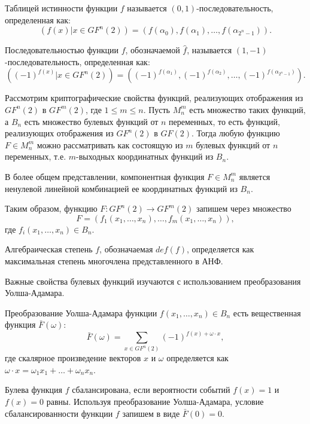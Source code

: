 Таблицей истинности функции $f$ называется $(0,1)$-последовательность,
определенная как:
\begin{equation}(f(x) | x \in GF^n(2)) = (f(\alpha_0), f(\alpha_1), \ldots,
f(\alpha_{2^n - 1})).\end{equation}

Последовательностью функции $f$, обозначаемой $\hat{f}$, называется
$(1,-1)$-последовательность, определенная как:
\begin{equation}((-1)^{f(x)}| x \in GF^n(2)) = ((-1)^{f(\alpha_1)},
(-1)^{f(\alpha_2)}, \ldots, (-1)^{f(\alpha_{2^n - 1})}).\end{equation}

Рассмотрим криптографические свойства функций, реализующих отображения из
$GF^n(2)$ в $GF^m(2)$, где $1 \leq m \leq n$. Пусть $M^m_n$ есть множество таких
функций, а $B_n$ есть множество булевых функций от $n$ переменных, то есть
функций, реализующих отображения из $GF^n(2)$ в $GF(2)$. Тогда любую функцию $F
\in M^m_n$ можно рассматривать как состоящую из $m$ булевых функций от $n$
переменных, т.е. $m$-выходных координатных функций из $B_n$.

В более общем представлении, компонентная функция $F \in M^m_n$ является
ненулевой линейной комбинацией ее координатных функций из $B_n$.

Таким образом, функцию $F: GF^n(2) \rightarrow GF^m(2)$ запишем через множество
\begin{equation}F = (f_1(x_1, \ldots, x_n), \ldots, f_m(x_1, \ldots,
x_n)),\end{equation}
где $f_i(x_1, \ldots, x_n) \in B_n$.

Алгебраическая степень $f$, обозначаемая $def(f)$, определяется как максимальная
степень многочлена представленного в АНФ.

Важные свойства булевых функций изучаются с использованием преобразования
Уолша-Адамара.

Преобразование Уолша-Адамара функции $f(x_1, \ldots, x_n) \in B_n$ есть
вещественная функция $\bar{F}(\omega)$:
\begin{equation}\bar{F}(\omega) = \sum_{x \in GF^n(2)}{(-1)^{f(x) + \omega \cdot
x}},\end{equation}
где скалярное произведение векторов $x$ и $\omega$ определяется как $\omega
\cdot x = \omega_1 x_1 + \ldots + \omega_n x_n$.

Булева функция $f$ сбалансирована, если вероятности событий $f(x) = 1$ и $f(x) =
0$ равны. Используя преобразование Уолша-Адамара, условие сбалансированности
функции $f$ запишем в виде $\bar{F}(0) = 0$.

